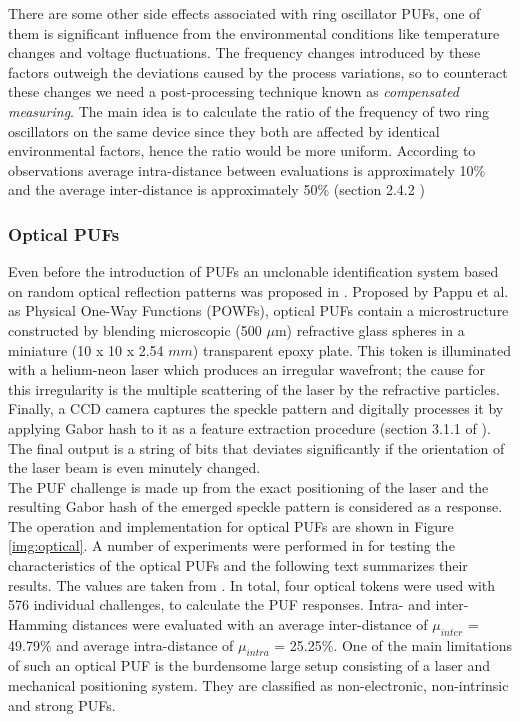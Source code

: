There are some other side effects associated with ring oscillator PUFs, one of them is significant influence from the environmental conditions like temperature changes and voltage fluctuations. The frequency changes introduced by these factors outweigh the deviations caused by the process variations, so to counteract these changes we need a post-processing technique known as \emph{compensated measuring}. The main idea is to calculate the ratio of the frequency of two ring oscillators
on the same device since they both are affected by identical environmental factors, hence the ratio would be more uniform. According to observations average intra-distance between evaluations is approximately 10\% and the average inter-distance is approximately 50\% (section 2.4.2 \cite{17})

\subsubsection{Optical PUFs}

Even before the introduction of PUFs an unclonable identification system based on random optical reflection patterns was proposed in \cite{th53}. Proposed by Pappu et al. as Physical One-Way Functions (POWFs), optical PUFs contain a microstructure constructed by blending microscopic (500 $\mu$m) refractive glass spheres in a miniature (10 x 10 x 2.54 $mm$) transparent epoxy plate. This token is illuminated with a helium-neon laser which produces an irregular wavefront;
the cause for this irregularity is the multiple scattering of the laser by the refractive particles. Finally, a CCD camera captures the speckle pattern and digitally processes it by applying Gabor hash to it as a feature extraction procedure (section 3.1.1 of \cite{thbook}). The final output is a string of bits that deviates significantly if the orientation of the laser beam is even minutely changed.\\

The PUF challenge is made up from the exact positioning of the laser and the resulting Gabor hash of the emerged speckle pattern is considered as a response. The operation and implementation for optical PUFs are shown in Figure \ref{img:optical}. A number of experiments were performed in \cite{19,39} for testing the characteristics of the optical PUFs and the following text summarizes their results. The values are taken from \cite{19,39}. In total, four optical tokens were used with 576
individual challenges, to calculate the PUF responses. Intra- and inter-Hamming distances were evaluated with an average inter-distance of $\mu_{inter}$ = 49.79\% and average intra-distance of
$\mu_{intra}$ = 25.25\%. One of the main limitations of such an optical PUF is the burdensome large setup consisting of a laser and mechanical positioning system. They are classified as non-electronic, non-intrinsic and strong PUFs.\\


